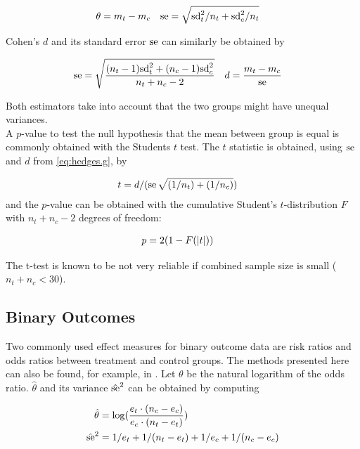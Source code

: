 \documentclass[11pt,a4paper,twoside]{book}\usepackage[]{graphicx}\usepackage[]{color}
\begin{document}
\begin{align}
\theta &= m_t - m_c & \operatorname{se} &= \sqrt{\textrm{sd}_t^2/n_t + \textrm{sd}_c^2/n_t}
\end{align}

Cohen's $d$ and its standard error $\operatorname{se}$ can similarly be obtained by

\begin{align}
\operatorname{se} &= \sqrt{\frac{(n_t - 1)\textrm{sd}_t^2 + (n_c - 1)\textrm{sd}_c^2}{n_t + n_c - 2}} & d &= \frac{m_t - m_c}{\operatorname{se}} \label{eq:hedges.g}
\end{align}

Both estimators take into account that the two groups might have unequal variances. \\ 
A $p$\hspace{0.4mm}-value to test the null hypothesis that the mean between group is equal is commonly obtained with the Students $t$ test. The $t$ statistic is obtained, using $\operatorname{se}$ and $d$ from \eqref{eq:hedges.g}, by

\begin{align}
t &= d/(\operatorname{se}\sqrt{(1/n_t)+(1/n_c)}) \nonumber
\end{align}
and the $p$\hspace{0.4mm}-value can be obtained with the cumulative Student's $t$-distribution $F$ with $n_t + n_c - 2$ degrees of freedom:

\begin{align}
p &= 2(1-F(\left\lvert t\right\rvert)) \nonumber
\end{align}

The t-test is known to be not very reliable if combined sample size is small ($n_t + n_c < 30$).

\subsection{Binary Outcomes}
Two commonly used effect measures for binary outcome data are risk ratios and odds ratios between treatment and control groups. 
The methods presented here can also be found, for example, in \cite[34]{Intro.meta}.
Let $\theta$ be the natural logarithm of the odds ratio. $\hat{\theta}$ and its variance $\hat{\operatorname{se}}^2$ can be obtained by computing

\begin{align}
\hat{\theta} &= \log(\frac{e_t\cdot(n_c - e_c)}{e_c\cdot(n_t - e_t)}) \nonumber \\
\hat{\operatorname{se}}^2 &= 1/e_t + 1/(n_t - e_t) + 1/e_c + 1/(n_c - e_c) \nonumber
\end{align}
\end{document}
